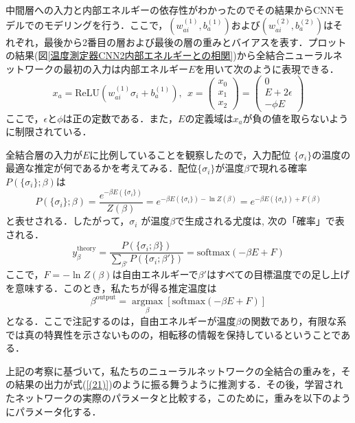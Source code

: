 \documentclass[a4paper,11pt]{jsreport}
\begin{document}
中間層への入力と内部エネルギーの依存性がわかったのでその結果からCNNモデルでのモデリングを行う．ここで，$(w_{ai}^{(1)}, b_a^{(1)})$および$(w_{ai}^{(2)}, b_a^{(2)})$はそれぞれ，最後から2番目の層および最後の層の重みとバイアスを表す．プロットの結果(図\ref{温度測定器CNN2内部エネルギーとの相関})から全結合ニューラルネットワークの最初の入力は内部エネルギー$E$を用いて次のように表現できる．
\begin{equation}
  x_a = \text{ReLU}(w_{ai}^{(1)}\sigma_i + b_a^{(1)}), \ \
  x = \begin{pmatrix} x_0 \\ x_1 \\ x_2 \end{pmatrix}
  = \begin{pmatrix} 0 \\ E+2\epsilon \\ -\phi E \end{pmatrix}
  \label{(19)}
\end{equation}
ここで，$\epsilon$と$\phi$は正の定数である．また，$E$の定義域は$x_a$が負の値を取らないように制限されている．\par
全結合層の入力が$E$に比例していることを観察したので，入力配位 $\{\sigma_i\}$の温度の最適な推定が何であるかを考えてみる．配位$\{ \sigma_i \}$が温度$\beta$で現れる確率$P(\{ \sigma_i \} ; \beta )$は
\begin{equation}
  P(\{ \sigma_i \} ; \beta )
  = \frac{e^{-\beta E(\{ \sigma_i \})}}{Z(\beta)}
  = e^{-\beta E(\{ \sigma_i \}) - \ln{Z(\beta)}}
  = e^{-\beta E(\{ \sigma_i \}) + F(\beta)}
\end{equation}
と表せされる．したがって，${\sigma_i}$ が温度$\beta$で生成される尤度は,
次の「確率」で表される．
\begin{equation}
  y_{\beta}^{\text{theory}} = \frac{P(\{\sigma_i ; \beta \})}{\sum_{\beta '}P(\{\sigma_i ; \beta ' \})} = \text{softmax}(-\beta E + F) \label{(21)}
\end{equation}
ここで，$F = -\ln{Z(\beta)}$は自由エネルギーで$\beta '$はすべての目標温度での足し上げを意味する．このとき，私たちが得る推定温度は
\begin{equation}
  \beta^{\text{output}} =
  \underset{\beta} {\operatorname{argmax}} \left[\text{softmax}(-\beta E + F)\right]
\end{equation}
となる．ここで注記するのは，自由エネルギーが温度$\beta$の関数であり，有限な系では真の特異性を示さないものの，相転移の情報を保持しているということである．\par
上記の考察に基づいて，私たちのニューラルネットワークの全結合の重みを，その結果の出力が式(\ref{(21)})のように振る舞うように推測する．その後，学習されたネットワークの実際のパラメータと比較する，このために，重みを以下のようにパラメータ化する．
\end{document}
